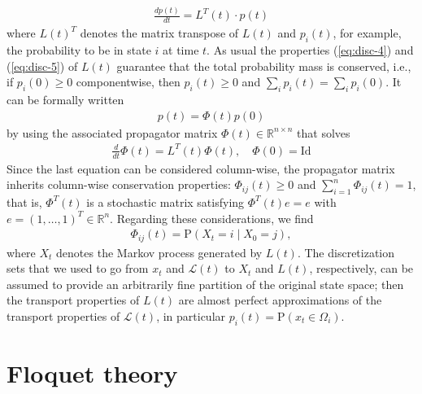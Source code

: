 \documentclass[aps, pre, preprint,unsortedaddress,a4paper,onecolumn]{revtex4}
\newcommand{\vect}[1]{#1}
\newcommand{\ml}[0]{\mathcal {L}}
\newcommand{\id}{\mathrm{Id}}
\newcommand{\myphi}{\Phi}
\newcommand{\prob}{\textrm{P}}
\begin{document}
\begin{align}
  \label{eq:disc-master}
  \frac{d\vect p(t)}{dt} = \vect L^T(t)\cdot \vect p(t)
\end{align}
where $\vect L(t)^T$ denotes the matrix transpose of $\vect L(t)$ and
$p_i(t)$, for example, the probability to be in state $i$ at time $t$.
As usual the properties (\ref{eq:disc-4}) and (\ref{eq:disc-5}) of
$\vect L(t)$ guarantee that the total probability mass is conserved,
i.e., if $p_i(0)\ge 0$ componentwise, then $p_i(t)\ge 0$ and $\sum_i
p_i(t) = \sum_ip_i(0)$.
It can be formally written
\begin{align}  \label{eq:disc-8}
\vect p(t)=\myphi(t)\vect p(0)
\end{align}
by using the
associated propagator matrix $\myphi(t)\in\mathbb R^{n\times n}$ that solves
\begin{align}
  \label{eq:disc-master-phi}
  \frac{d}{dt}\myphi(t) = \vect L^T(t)\myphi(t), \quad \myphi(0) = \id
\end{align}
Since the last equation can be considered column-wise, the propagator matrix inherits column-wise conservation properties:
$\Phi_{ij}(t) \ge  0$
and $\sum\limits_{i=1}^n \Phi_{ij}(t)  =  1$,
that is, $\myphi^T(t)$ is a
stochastic matrix satisfying $\myphi^T(t)\vect e=\vect e$
with $\vect e=(1,\ldots,1)^T\in \mathbb R^n$.
Regarding these considerations, we find
\begin{align}
\label{eq:disc-10}  
\myphi_{ij}(t)=\prob\left(\vect X_t=i\mid \vect X_0=j \right),
\end{align}
where $\vect X_t$ denotes the Markov process generated by $\vect L(t)$.
 The
discretization sets that we used to go from $\vect x_t$ and $\ml(t)$ to $\vect X_t$
and $\vect L(t)$, respectively, can be assumed to provide an arbitrarily fine
partition of the original state space; then the transport properties
of $\vect L(t)$ are almost perfect approximations of the transport properties
of $\ml(t)$, in particular $p_i(t)=\prob(x_t\in \Omega_i)$.


\section{Floquet theory}
\label{sec:floquet}
\end{document}

